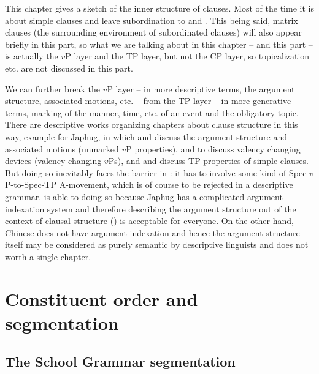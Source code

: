 \documentclass[../main.tex]{subfiles}
\begin{document}
This chapter gives a sketch of the inner structure of clauses.
Most of the time it is about simple clauses and leave subordination to 
 and .
This being said, matrix clauses (the surrounding environment of subordinated clauses)
will also appear briefly in this part, so what we are talking about in this chapter -- and this part -- is 
actually the $v$P layer and the TP layer, but not the CP layer, so topicalization etc. are not 
discussed in this part. 

We can further break the $v$P layer -- 
in more descriptive terms, the argument structure, associated motions, etc.
-- from the TP layer -- 
in more generative terms, marking of the manner, time, etc. of an event and the obligatory topic. 
There are descriptive works organizing chapters about clause structure in this way, 
example \citet{jacques2021grammar} for Japhug, 
in which  and  discuss the argument structure 
and associated motions (unmarked $v$P properties), 
and  to  discuss valency changing devices (valency changing $v$Ps), 
and  and  discuss TP properties of simple clauses. 
But doing so inevitably faces the barrier in : 
it has to involve some kind of Spec-$v$P-to-Spec-TP A-movement, 
which is of course to be rejected in a descriptive grammar. 
\citet{jacques2021grammar} is able to doing so 
because Japhug has a complicated argument indexation system 
and therefore describing the argument structure out of the context of clausal structure () 
is acceptable for everyone.
On the other hand, Chinese does not have argument indexation and hence 
the argument structure itself may be considered as purely semantic by descriptive linguists
and does not worth a single chapter.

\section{Constituent order and segmentation}\label{sec:clause-constituent-order-overview}

\subsection{The School Grammar segmentation}
\end{document}
